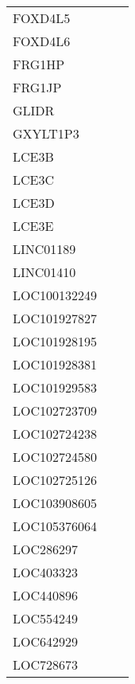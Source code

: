 \begin{tabular}{lcc}
FOXD4L5            &                &            \\
FOXD4L6            &                &            \\
FRG1HP             &                &            \\
FRG1JP             &                &            \\
GLIDR              &                &            \\
GXYLT1P3           &                &            \\
LCE3B              &                &            \\
LCE3C              &                &            \\
LCE3D              &                &            \\
LCE3E              &                &            \\
LINC01189          &                &            \\
LINC01410          &                &            \\
LOC100132249       &                &            \\
LOC101927827       &                &            \\
LOC101928195       &                &            \\
LOC101928381       &                &            \\
LOC101929583       &                &            \\
LOC102723709       &                &            \\
LOC102724238       &                &            \\
LOC102724580       &                &            \\
LOC102725126       &                &            \\
LOC103908605       &                &            \\
LOC105376064       &                &            \\
LOC286297          &                &            \\
LOC403323          &                &            \\
LOC440896          &                &            \\
LOC554249          &                &            \\
LOC642929          &                &            \\
LOC728673          &                &            \\

\end{tabular}
